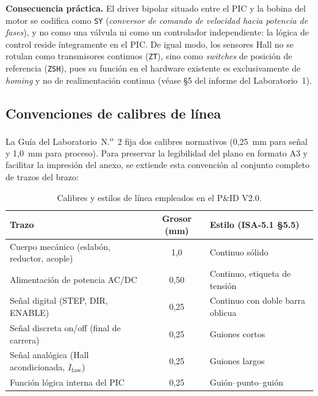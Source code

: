 \documentclass[11pt]{article}
\begin{document}
\textbf{Consecuencia práctica.} El driver bipolar situado entre el PIC y la bobina del motor se codifica como \texttt{SY} (\emph{conversor de comando de velocidad hacia potencia de fases}), y no como una válvula ni como un controlador independiente: la lógica de control reside íntegramente en el PIC. De igual modo, los sensores Hall no se rotulan como transmisores continuos (\texttt{ZT}), sino como \emph{switches} de posición de referencia (\texttt{ZSH}), pues su función en el hardware existente es exclusivamente de \emph{homing} y no de realimentación continua (véase §5 del informe del Laboratorio~1).

\subsection{Convenciones de calibres de línea}
\label{subsec:calibres}

La Guía del Laboratorio~N.\textsuperscript{o}~2 fija dos calibres normativos (0{,}25~mm para señal y 1{,}0~mm para proceso). Para preservar la legibilidad del plano en formato A3 y facilitar la impresión del anexo, se extiende esta convención al conjunto completo de trazos del brazo:

\begin{table}[H]
	\centering\small
	\caption{Calibres y estilos de línea empleados en el P\&ID V2.0.}
	\label{tab:calibres}
	\begin{tabular}{@{}l c l@{}}
		\toprule
		\textbf{Trazo} & \textbf{Grosor (mm)} & \textbf{Estilo (ISA-5.1 §5.5)} \\
		\midrule
		Cuerpo mecánico (eslabón, reductor, acople) & 1{,}0 & Continuo sólido \\
		Alimentación de potencia AC/DC              & 0{,}50 & Continuo, etiqueta de tensión \\
		Señal digital (STEP, DIR, ENABLE)           & 0{,}25 & Continuo con doble barra oblicua \\
		Señal discreta on/off (final de carrera)    & 0{,}25 & Guiones cortos \\
		Señal analógica (Hall acondicionada, $I_\text{fase}$) & 0{,}25 & Guiones largos \\
		Función lógica interna del PIC              & 0{,}25 & Guión–punto–guión \\
		\bottomrule
	\end{tabular}
\end{table}

\end{document}
